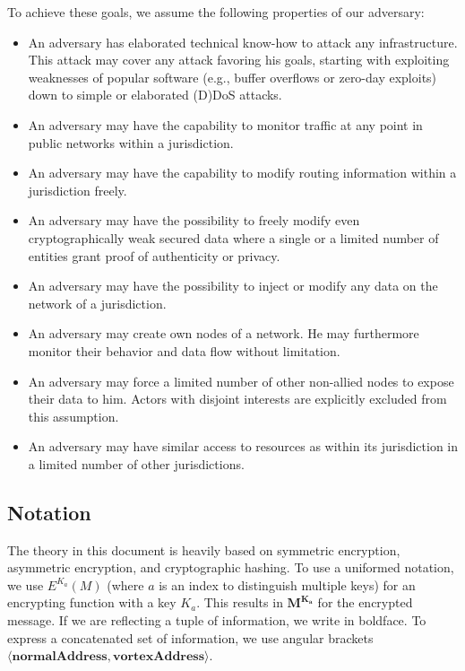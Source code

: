 \documentclass[10pt,journal,compsoc,twocolumn,twoside]{IEEEtran}
\begin{document}
To achieve these goals, we assume the following properties of our adversary:
\begin{itemize}
	\item An adversary has elaborated technical know-how to attack any infrastructure. This attack may cover any attack favoring his goals, starting with exploiting weaknesses of popular software (e.g., buffer overflows or zero-day exploits) down to simple or elaborated (D)DoS attacks.
	\item An adversary may have the capability to monitor traffic at any point in public networks within a jurisdiction.
	\item An adversary may have the capability to modify routing information within a jurisdiction freely.
	\item An adversary may have the possibility to freely modify even cryptographically weak secured data where a single or a limited number of entities grant proof of authenticity or privacy.
	\item An adversary may have the possibility to inject or modify any data on the network of a jurisdiction.
	\item An adversary may create own nodes of a network. He may furthermore monitor their behavior and data flow without limitation.
	\item An adversary may force a limited number of other non-allied nodes to expose their data to him. Actors with disjoint interests are explicitly excluded from this assumption.
	\item An adversary may have similar access to resources as within its jurisdiction in a limited number of other jurisdictions.
\end{itemize}


\subsection{Notation \label{sec:encNot}}
The theory in this document is heavily based on symmetric encryption, asymmetric encryption, and cryptographic hashing. To use a uniformed notation, we use $E^{K_a}(M)$ (where $a$ is an index to distinguish multiple keys) for an encrypting function with a key $K_a$. This results in $\mathbf{M^{K_a}}$ for the encrypted message. If we are reflecting a tuple of information, we write in boldface. To express a concatenated set of information, we use angular brackets $\mathbf{\langle normalAddress,vortexAddress\rangle }$. 
\end{document}
